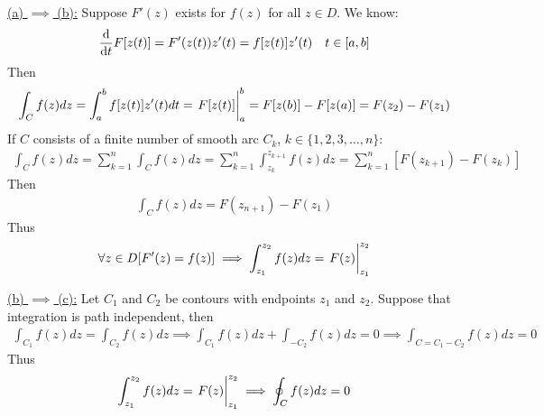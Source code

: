 \documentclass[12pt, english]{book}
\makeatletter
\renewenvironment{proof}[1][\proofname]{\par
	\pushQED{\qed}%
	\normalfont \topsep6\p@\@plus6\p@\relax
	\list{}{%
		\settowidth{\leftmargin}{\itshape\proofname:\hskip\labelsep}%
		\setlength{\labelwidth}{0pt}%
		\setlength{\itemindent}{-\leftmargin}%
		}%
	\item[\hskip\labelsep\itshape#1\@addpunct{:}]\ignorespaces
	}{\popQED\endlist\@endpefalse}
\makeatother
\begin{document}
	\begin{proof}
		\underline{(a) \(\implies\) (b):} \newline
		Suppose \(F'(z)\) exists for \(f(z)\) for all \(z \in D\). We know:
		\begin{align*}
			\dv{t} F[z(t)] &= F'(z(t)) z'(t) = f[z(t)]z'(t) & t \in [a,b]
		\end{align*}
		Then 
		\begin{align*}
			\int_{C} f(z) dz = \int_{a}^{b} f[z(t)] z'(t) dt = \eval{F[z(t)]}_{a}^{b} = F[z(b)] - F[z(a)] = F(z_2) - F(z_1) 
		\end{align*}
		If \(C\) consists of a finite number of smooth arc \(C_k\), \(k \in \{1, 2, 3, \ldots, n\}\):
		\begin{align*}
			\int_{C} f(z) dz = \sum_{k=1}^{n} \int_{C} f(z) dz = \sum_{k=1}^{n} \int_{z_k}^{z_{k+1}} f(z) dz = \sum_{k=1}^{n}[F(z_{k+1}) - F(z_k)]
 		\end{align*}
		Then 
		\begin{align*}
			\int_{C} f(z) dz = F(z_{n+1}) - F(z_1)
		\end{align*}
		Thus 
		\begin{align*}
			\forall z \in D [F'(z) = f(z)] 
			\implies \int_{z_1}^{z_2} f(z) dz = \eval{F(z)}_{z_1}^{z_2}
		\end{align*}
		
		\underline{(b) \(\implies\) (c):} \newline
		Let \(C_1\) and \(C_2\) be contours with endpoints \(z_1\) and \(z_2\). Suppose that integration is path independent, then
		\begin{align*}
			\int_{C_1} f(z) dz = \int_{C_2} f(z) dz
			\implies \int_{C_1} f(z) dz + \int_{-C_2} f(z) dz = 0 
			\implies \int_{C = C_1 - C_2} f(z) dz = 0
		\end{align*}
		Thus 
		\begin{align*}
			\int_{z_1}^{z_2} f(z) dz = \eval{F(z)}_{z_1}^{z_2}
			\implies \oint_{C} f(z) dz = 0
		\end{align*}
		

\end{proof}
\end{document}
